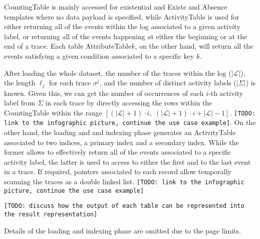 \textsf{CountingTable} is mainly accessed for existential and \textsf{Exists} and \textsf{Absence} templates where no data payload is specified, while  \textsf{ActivityTable} is  used for either returning all of the events within the log associated to a given activity label, or returning all of the events happening at either the beginning or at the end of a trace. Each table \textsf{AttributeTable$k$}, on the other hand, will %
return all the events satisfying a given condition associated to a specific %
key $k$. %

After loading the whole dataset, the number of the traces within the log ($|\mathcal{L}|$), the length $\ell_j$ for each trace $\sigma^j$, and the number of distinct activity labels ($|\Sigma|$) is known. Given this, we can get the number of occurrences of each $i$-th activity label from $\Sigma$ in each trace by directly accessing the rows within the \textsf{CountingTable} within the range $[(|\mathcal{L}|+1)\cdot i,\; (|\mathcal{L}|+1)\cdot i+|\mathcal{L}|-1]$.
\texttt{\color{red}[TODO: link to the infographic picture, continue the use case example]}. On the other hand, the loading and and indexing phase generates an \textsf{ActivityTable} associated to two indices, a primary index and a secondary index. While the former allows to effectively return all of the events associated to a specific activity label, the latter is used to access to either the first and to the last event in a trace. If required, pointers associated to each record allow temporally scanning the traces as a double linked list. \texttt{\color{red}[TODO: link to the infographic picture, continue the use case example]}

\texttt{\color{red}[TODO: discuss how the output of each table can be represented into the result representation]}

Details of the loading and indexing phase are omitted due to the page limits.



